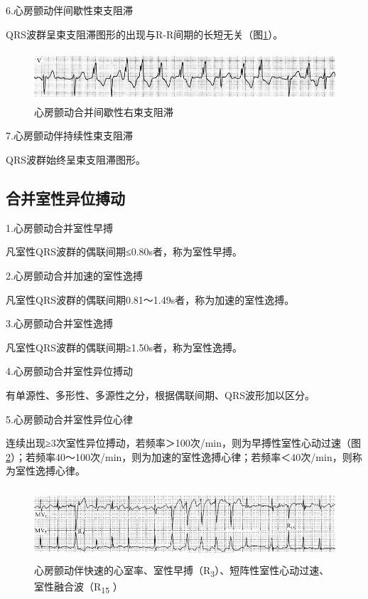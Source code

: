 6.心房颤动伴间歇性束支阻滞

QRS波群呈束支阻滞图形的出现与R-R间期的长短无关（图\ref{fig13-26}）。

\begin{figure}[!htbp]
 \centering
 \includegraphics[width=5.58333in,height=0.73958in]{./images/Image00234.jpg}
 \captionsetup{justification=centering}
 \caption{心房颤动合并间歇性右束支阻滞}
 \label{fig13-26}
  \end{figure} 

7.心房颤动伴持续性束支阻滞

QRS波群始终呈束支阻滞图形。

\protect\hypertarget{text00020.htmlux5cux23subid207}{}{}

\subsection{合并室性异位搏动}

1.心房颤动合并室性早搏

凡室性QRS波群的偶联间期≤0.80s者，称为室性早搏。

2.心房颤动合并加速的室性逸搏

凡室性QRS波群的偶联间期0.81～1.49s者，称为加速的室性逸搏。

3.心房颤动合并室性逸搏

凡室性QRS波群的偶联间期≥1.50s者，称为室性逸搏。

4.心房颤动合并室性异位搏动

有单源性、多形性、多源性之分，根据偶联间期、QRS波形加以区分。

5.心房颤动合并室性异位心律

连续出现≥3次室性异位搏动，若频率＞100次/min，则为早搏性室性心动过速（图\ref{fig13-27}）；若频率40～100次/min，则为加速的室性逸搏心律；若频率＜40次/min，则称为室性逸搏心律。

\begin{figure}[!htbp]
 \centering
 \includegraphics[width=5.58333in,height=1.0625in]{./images/Image00235.jpg}
 \captionsetup{justification=centering}
 \caption{心房颤动伴快速的心室率、室性早搏（R\textsubscript{3}）、短阵性室性心动过速、室性融合波（R\textsubscript{15} ）}
 \label{fig13-27}
  \end{figure} 


